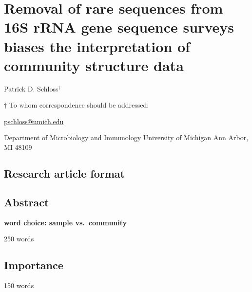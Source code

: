 \documentclass[
]{article}
\author{}
\date{\vspace{-2.5em}}
\begin{document}
\hypertarget{removal-of-rare-sequences-from-16s-rrna-gene-sequence-surveys-biases-the-interpretation-of-community-structure-data}{%
\section{Removal of rare sequences from 16S rRNA gene sequence surveys
biases the interpretation of community structure
data}\label{removal-of-rare-sequences-from-16s-rrna-gene-sequence-surveys-biases-the-interpretation-of-community-structure-data}}

\vspace{35mm}

Patrick D. Schloss\({^\dagger}\)

\vspace{40mm}

\(\dagger\) To whom correspondence should be addressed:

\href{mailto:pschloss@umich.edu}{pschloss@umich.edu}

Department of Microbiology and Immunology University of Michigan Ann
Arbor, MI 48109

\vspace{35mm}

\hypertarget{research-article-format}{%
\subsection{Research article format}\label{research-article-format}}

\newpage

\hypertarget{abstract}{%
\subsection{Abstract}\label{abstract}}

\textbf{word choice: sample vs.~community}

250 words

\newpage

\hypertarget{importance}{%
\subsection{Importance}\label{importance}}

150 words

\newpage
\end{document}
